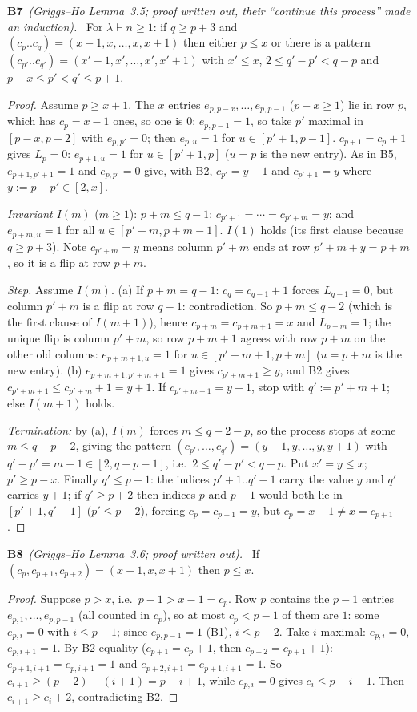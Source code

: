 \documentclass[11pt]{article}
\newcommand{\step}[2]{\par\medskip\noindent\textbf{#1}\ \textit{#2}\ }
\begin{document}
\step{B7}{(Griggs--Ho Lemma~3.5; proof written out, their ``continue this process'' made an induction).} For $\lambda\vdash n\ge1$: if $q\ge p+3$ and $(c_p..c_q)=(x-1,x,\ldots,x,x+1)$ then either $p\le x$ or there is a pattern $(c_{p'}..c_{q'})=(x'-1,x',\ldots,x',x'+1)$ with $x'\le x$, $2\le q'-p'<q-p$ and $p-x\le p'<q'\le p+1$.
\begin{proof} Assume $p\ge x+1$. The $x$ entries $e_{p,p-x},\ldots,e_{p,p-1}$ ($p-x\ge1$) lie in row $p$, which has $c_p=x-1$ ones, so one is $0$; $e_{p,p-1}=1$, so take $p'$ maximal in $[p-x,p-2]$ with $e_{p,p'}=0$; then $e_{p,u}=1$ for $u\in[p'+1,p-1]$. $c_{p+1}=c_p+1$ gives $L_p=0$: $e_{p+1,u}=1$ for $u\in[p'+1,p]$ ($u=p$ is the new entry). As in B5, $e_{p+1,p'+1}=1$ and $e_{p,p'}=0$ give, with B2, $c_{p'}=y-1$ and $c_{p'+1}=y$ where $y:=p-p'\in[2,x]$.

\emph{Invariant $I(m)$} ($m\ge1$): $p+m\le q-1$; $c_{p'+1}=\cdots=c_{p'+m}=y$; and $e_{p+m,u}=1$ for all $u\in[p'+m,p+m-1]$. $I(1)$ holds (its first clause because $q\ge p+3$). Note $c_{p'+m}=y$ means column $p'+m$ ends at row $p'+m+y=p+m$, so it is a flip at row $p+m$.

\emph{Step.} Assume $I(m)$. (a) If $p+m=q-1$: $c_q=c_{q-1}+1$ forces $L_{q-1}=0$, but column $p'+m$ is a flip at row $q-1$: contradiction. So $p+m\le q-2$ (which is the first clause of $I(m+1)$), hence $c_{p+m}=c_{p+m+1}=x$ and $L_{p+m}=1$; the unique flip is column $p'+m$, so row $p+m+1$ agrees with row $p+m$ on the other old columns: $e_{p+m+1,u}=1$ for $u\in[p'+m+1,p+m]$ ($u=p+m$ is the new entry). (b) $e_{p+m+1,p'+m+1}=1$ gives $c_{p'+m+1}\ge y$, and B2 gives $c_{p'+m+1}\le c_{p'+m}+1=y+1$. If $c_{p'+m+1}=y+1$, stop with $q':=p'+m+1$; else $I(m+1)$ holds.

\emph{Termination:} by (a), $I(m)$ forces $m\le q-2-p$, so the process stops at some $m\le q-p-2$, giving the pattern $(c_{p'},\ldots,c_{q'})=(y-1,y,\ldots,y,y+1)$ with $q'-p'=m+1\in[2,q-p-1]$, i.e.\ $2\le q'-p'<q-p$. Put $x'=y\le x$; $p'\ge p-x$. Finally $q'\le p+1$: the indices $p'+1..q'-1$ carry the value $y$ and $q'$ carries $y+1$; if $q'\ge p+2$ then indices $p$ and $p+1$ would both lie in $[p'+1,q'-1]$ ($p'\le p-2$), forcing $c_p=c_{p+1}=y$, but $c_p=x-1\ne x=c_{p+1}$.
\end{proof}

\step{B8}{(Griggs--Ho Lemma~3.6; proof written out).} If $(c_p,c_{p+1},c_{p+2})=(x-1,x,x+1)$ then $p\le x$.
\begin{proof} Suppose $p>x$, i.e.\ $p-1>x-1=c_p$. Row $p$ contains the $p-1$ entries $e_{p,1},\ldots,e_{p,p-1}$ (all counted in $c_p$), so at most $c_p<p-1$ of them are $1$: some $e_{p,i}=0$ with $i\le p-1$; since $e_{p,p-1}=1$ (B1), $i\le p-2$. Take $i$ maximal: $e_{p,i}=0$, $e_{p,i+1}=1$. By B2 equality ($c_{p+1}=c_p+1$, then $c_{p+2}=c_{p+1}+1$): $e_{p+1,i+1}=e_{p,i+1}=1$ and $e_{p+2,i+1}=e_{p+1,i+1}=1$. So $c_{i+1}\ge(p+2)-(i+1)=p-i+1$, while $e_{p,i}=0$ gives $c_i\le p-i-1$. Then $c_{i+1}\ge c_i+2$, contradicting B2. \end{proof}
\end{document}
